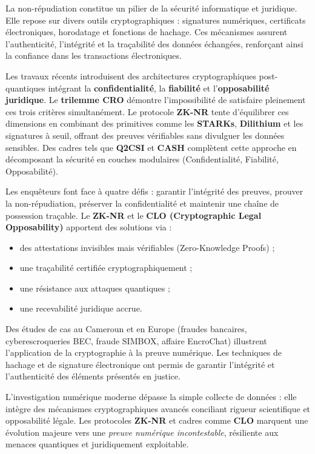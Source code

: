 \documentclass[12pt, a4em]{article}
\begin{document}
	La non-répudiation constitue un pilier de la sécurité informatique et juridique. Elle repose sur divers outils cryptographiques : signatures numériques, certificats électroniques, horodatage et fonctions de hachage. Ces mécanismes assurent l’authenticité, l’intégrité et la traçabilité des données échangées, renforçant ainsi la confiance dans les transactions électroniques.
	
	Les travaux récents introduisent des architectures cryptographiques post-quantiques intégrant la \textbf{confidentialité}, la \textbf{fiabilité} et l’\textbf{opposabilité juridique}. Le \textbf{trilemme CRO} démontre l’impossibilité de satisfaire pleinement ces trois critères simultanément.  
	Le protocole \textbf{ZK-NR} tente d’équilibrer ces dimensions en combinant des primitives comme les \textbf{STARKs}, \textbf{Dilithium} et les signatures à seuil, offrant des preuves vérifiables sans divulguer les données sensibles. Des cadres tels que \textbf{Q2CSI} et \textbf{CASH} complètent cette approche en décomposant la sécurité en couches modulaires (Confidentialité, Fiabilité, Opposabilité).
	
	Les enquêteurs font face à quatre défis : garantir l’intégrité des preuves, prouver la non-répudiation, préserver la confidentialité et maintenir une chaîne de possession traçable.  
	Le \textbf{ZK-NR} et le \textbf{CLO (Cryptographic Legal Opposability)} apportent des solutions via :
	\begin{itemize}
		\item des attestations invisibles mais vérifiables (Zero-Knowledge Proofs) ;
		\item une traçabilité certifiée cryptographiquement ;
		\item une résistance aux attaques quantiques ;
		\item une recevabilité juridique accrue.
	\end{itemize}
	
	Des études de cas au Cameroun et en Europe (fraudes bancaires, cyberescroqueries BEC, fraude SIMBOX, affaire EncroChat) illustrent l’application de la cryptographie à la preuve numérique. Les techniques de hachage et de signature électronique ont permis de garantir l’intégrité et l’authenticité des éléments présentés en justice.
	
	L’investigation numérique moderne dépasse la simple collecte de données : elle intègre des mécanismes cryptographiques avancés conciliant rigueur scientifique et opposabilité légale.  
	Les protocoles \textbf{ZK-NR} et cadres comme \textbf{CLO} marquent une évolution majeure vers une \textit{preuve numérique incontestable}, résiliente aux menaces quantiques et juridiquement exploitable.
	
\end{document}
